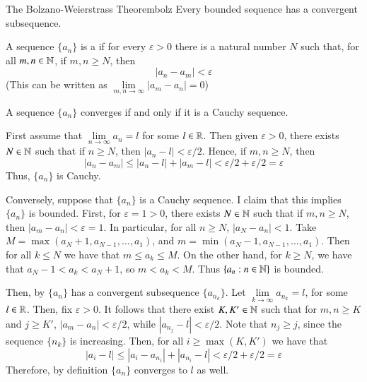 \documentclass[12pt]{report}
\begin{document}
\begin{cor}{The Bolzano-Weierstrass Theorem}{bolz}
    Every bounded sequence has a convergent subsequence.
\end{cor}


\begin{defn}{}{}
    A sequence $\{a_n\}$ is a  if for every $\varepsilon > 0$ there is a natural number $N$ such that, for all $m,n \in \mathbb N$, if $m,n \geq N$, then \begin{equation*}
        |a_n-a_m| <\varepsilon
    \end{equation*}
    (This can be written as $\lim\limits_{m,n\rightarrow \infty}|a_m-a_n| = 0$)
\end{defn}


\begin{thm}{}{}
    A sequence $\{a_n\}$ converges if and only if it is a Cauchy sequence.
\end{thm}
\begin{proof*}{}{}
    First assume that $\lim\limits_{n\rightarrow \infty}a_n = l$ for some $l \in \mathbb R$. Then given $\varepsilon > 0$, there exists $N \in \mathbb N$ such that if $n \geq N$, then $|a_n - l| < \varepsilon/2$. Hence, if $m,n \geq N$, then $$|a_n - a_m| \leq |a_n - l| + |a_m-l| < \varepsilon/2+\varepsilon/2 = \varepsilon$$
    Thus, $\{a_n\}$ is Cauchy.

    Conversely, suppose that $\{a_n\}$ is a Cauchy sequence. I claim that this implies $\{a_n\}$ is bounded. First, for $\varepsilon = 1 > 0$, there exists $N \in \mathbb N$ such that if $m,n \geq N$, then $|a_m-a_n| < \varepsilon = 1$. In particular, for all $n \geq N$, $|a_N - a_n| < 1$. Take $M = \max(a_N + 1, a_{N-1},...,a_1)$, and $m = \min(a_N - 1, a_{N-1},...,a_1)$. Then for all $k \leq N$ we have that $m \leq a_k \leq M$. On the other hand, for $k \geq N$, we have that $a_N - 1 < a_k < a_N + 1$, so $m < a_k < M$. Thus $\{a_n:n \in \mathbb N\}$ is bounded. 

    Then, by  $\{a_n\}$ has a convergent subsequence $\{a_{n_k}\}$. Let $\lim\limits_{k\rightarrow \infty}a_{n_k} = l$, for some $l \in \mathbb R$. Then, fix $\varepsilon > 0$. It follows that there exist $K, K' \in \mathbb N$ such that for $m,n \geq K$ and $j \geq K'$, $|a_m - a_n| < \varepsilon/2$, while $|a_{n_j} - l| < \varepsilon/2$. Note that $n_j \geq j$, since the sequence $\{n_k\}$ is increasing. Then, for all $i \geq \max(K,K')$ we have that \begin{equation*}
        |a_i - l| \leq |a_i - a_{n_i}| + |a_{n_i} - l| < \varepsilon/2 + \varepsilon/2 = \varepsilon
    \end{equation*}
    Therefore, by definition $\{a_n\}$ converges to $l$ as well.
\end{proof*}
\end{document}
